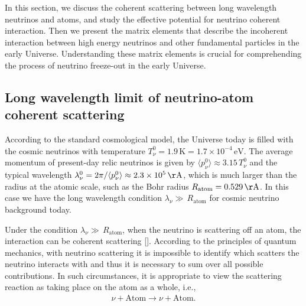 In this section, we discuss the coherent scattering between long wavelength neutrinos and atoms, and study the effective potential for neutrino coherent interaction. Then we present the matrix elements that describe the incoherent interaction between high energy neutrinos and other fundamental particles in the early Universe. Understanding these matrix elements is crucial for comprehending the process of neutrino freeze-out in the early Universe.


\subsection{Long wavelength limit of neutrino-atom coherent scattering}\label{LongWavelength}
According to the standard cosmological model, the Universe today is filled with the cosmic neutrinos with temperature $T_{\nu}^0=1.9 \,\mathrm{K}=1.7\times10^{-4}\,\mathrm{eV}$.
The average momentum of present-day relic neutrinos is given by $\langle p_\nu^0\rangle\approx3.15\,T_\nu^0$ and the typical wavelength $\lambda_\nu^0={2\pi}/{\langle p_\nu^0\rangle}\approx2.3\times10^5\,\mathrm{\AA}$, which is much larger than the radius at the atomic scale, such as the Bohr radius $R_{\mathrm{atom}}=0.529\,\mathrm{\AA}$. In this case we have the long wavelength condition $\lambda_\nu\gg\,R_{\mathrm{atom}}$ for cosmic neutrino background today.  

Under the condition $\lambda_\nu\gg\,R_{\mathrm{atom}}$, when the neutrino is scattering off an atom, the interaction can be coherent scattering [\cite{PhysRevD.38.32,PhysRevD.21.663,Papavassiliou:2005cs}]. According to the principles of quantum mechanics, with neutrino scattering it is impossible to identify which scatters the neutrino interacts with and thus it is necessary to sum over all possible contributions. In such circumstances, it is appropriate to view the scattering reaction as taking place on the atom as a whole, i.e.,
\begin{align}
\nu+\mathrm{Atom}\longrightarrow\nu+\mathrm{Atom}.
\end{align}

